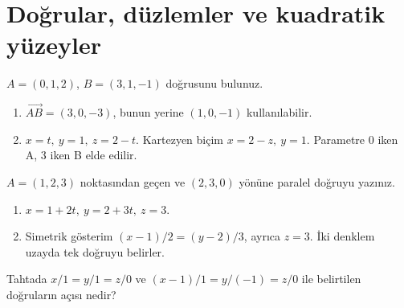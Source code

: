 \clearpage\section{Doğrular, düzlemler ve kuadratik yüzeyler}
\begin{tcolorbox}[title={Örnek 2.1 | İki noktadan geçen doğru},colframe=accent]\(A=(0,1,2)\), \(B=(3,1,-1)\) doğrusunu bulunuz.
\par{}\end{tcolorbox}
\begin{tcolorbox}[title={Adım adım çözüm},colback=green!3!white,colframe=green]\begin{enumerate}
\item \(\overrightarrow{AB}=(3,0,-3)\), bunun yerine \((1,0,-1)\) kullanılabilir.
\item \(x=t,\ y=1,\ z=2-t\). Kartezyen biçim \(x=2-z,\ y=1\). Parametre 0 iken A, 3 iken B elde edilir.
\end{enumerate}\end{tcolorbox}
\begin{tcolorbox}[title={Örnek 2.2 | Nokta ve paralel vektör},colframe=accent]\(A=(1,2,3)\) noktasından geçen ve \((2,3,0)\) yönüne paralel doğruyu yazınız.
\par{}\end{tcolorbox}
\begin{tcolorbox}[title={Adım adım çözüm},colback=green!3!white,colframe=green]\begin{enumerate}
\item \(x=1+2t,\ y=2+3t,\ z=3\).
\item Simetrik gösterim \((x-1)/2=(y-2)/3\), ayrıca \(z=3\). İki denklem uzayda tek doğruyu belirler.
\end{enumerate}\end{tcolorbox}
\begin{tcolorbox}[title={Örnek 2.3 | Tahtadaki sıfır paydalı gösterim},colframe=accent]Tahtada \(x/1=y/1=z/0\) ve \((x-1)/1=y/(-1)=z/0\) ile belirtilen doğruların açısı nedir?
\par{}\end{tcolorbox}
